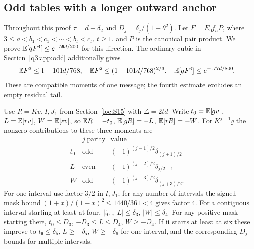 \subsection{Odd tables with a longer outward anchor}\label{loc:S16}
Throughout this proof $\tau=d-\delta_{2}$ and $D_j=\delta_{j}/(1-\theta^2)$.
Let $F=E_0f_aP$, where $3\le a<b_1<c_1<\cdots<b_t<c_t$, $t\ge1$,
and $P$ is the canonical pair product. We prove
$\mathbb E[qF^4]\le e^{-59d/200}$ for this direction.
The ordinary cubic in Section~\ref{q3:app:odd} additionally gives
\[
 \mathbb E F^3\le1-101d/768,\quad
 \mathbb E F^2\le(1-101d/768)^{2/3},\quad
 \mathbb E[qF^3]\le e^{-177d/800}.
\]
These are compatible moments of one message; the fourth estimate excludes
an empty residual tail.

Use $R=Kv$, $I,J_1$ from Section~\ref{loc:S15} with $\Delta=2td$.
Write $t_0=\mathbb E[gv]$, $L=\mathbb E[rv]$, $W=\mathbb E[sv]$, so
$\mathbb E R=-t_0$, $\mathbb E[gR]=-L$, $\mathbb E[rR]=-W$.
For $K^{j-1}g$ the nonzero contributions to these three moments are
\[
 \begin{array}{c|c|c}
 &j\text{ parity}&\text{value}\\\hline
 t_0&\text{odd}&(-1)^{(j-1)/2}\delta_{(j+1)/2}\\
 L&\text{even}&(-1)^{(j-2)/2}\delta_{j/2+1}\\
 W&\text{odd}&(-1)^{(j-3)/2}\delta_{(j+3)/2}.
 \end{array}
\]
For one interval use factor $3/2$ in $I,J_1$; for any number of intervals
the signed-mask bound $(1+x)/(1-x)^2\le1440/361<4$ gives factor $4$.
For a contiguous interval starting at least at four,
$|t_0|,|L|\le \delta_{3}$, $|W|\le \delta_{4}$.
For any positive mask starting there,
$t_0\le D_3$, $-D_3\le L\le D_4$, $W\ge-D_4$.
If it starts at least at six these improve to
$t_0\le \delta_{5}$, $L\ge-\delta_{5}$, $W\ge-\delta_{6}$ for one interval,
and the corresponding $D_j$ bounds for multiple intervals.

